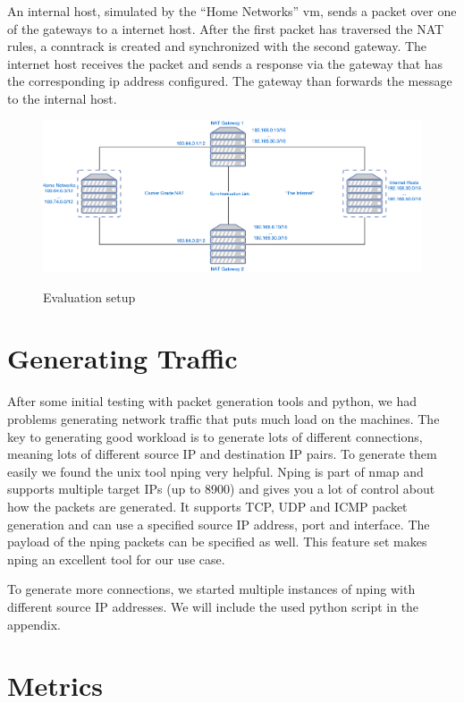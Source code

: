 \documentclass{report}
\begin{document}
An internal host, simulated by the ``Home Networks'' vm, sends a packet
over one of the gateways to a internet host. After the first packet has
traversed the NAT rules, a conntrack is created and synchronized with the
second gateway. The internet host receives the packet and sends a
response via the gateway that has the corresponding ip address
configured. The gateway than forwards the message to the internal host.

\begin{figure}[ht]
	\centering
	\includegraphics[width=\textwidth]{../EvaluationSetup.pdf}
	\label{EvaluationSetup.pdf}
	\caption{Evaluation setup}  
\end{figure}

\section{Generating Traffic}\label{generating-traffic}

After some initial testing with packet generation tools and python, we
had problems generating network traffic that puts much load on the
machines. The key to generating good workload is to generate lots of
different connections, meaning lots of different source IP and destination
IP pairs. To generate them easily we found the unix tool nping\cite{nping}
very helpful. Nping is part of nmap\cite{nmap} and supports multiple target
IPs (up to 8900) and gives you a lot of control about how the packets
are generated. It supports TCP, UDP and ICMP packet generation and can
use a specified source IP address, port and interface. The payload of
the nping packets can be specified as well. This feature set makes nping
an excellent tool for our use case.

To generate more connections, we started multiple instances of nping with
different source IP addresses. We will include the used python script in
the appendix.



\section{Metrics}\label{metrics}
\end{document}

